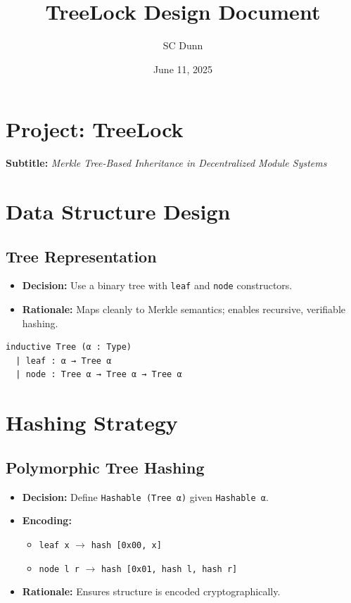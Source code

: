 \documentclass{article}
\title{TreeLock Design Document}
\date{June 11, 2025}
\author{SC Dunn}
\begin{document}
\maketitle

\section*{Project: TreeLock}
\textbf{Subtitle:} \textit{Merkle Tree-Based Inheritance in Decentralized Module Systems}

\section{Data Structure Design}

\subsection*{Tree Representation}
\begin{itemize}[noitemsep]
  \item \textbf{Decision:} Use a binary tree with \texttt{leaf} and \texttt{node} constructors.
  \item \textbf{Rationale:} Maps cleanly to Merkle semantics; enables recursive, verifiable hashing.
\end{itemize}

\begin{lstlisting}[language=lean]
inductive Tree (α : Type)
  | leaf : α → Tree α
  | node : Tree α → Tree α → Tree α
\end{lstlisting}

\section{Hashing Strategy}

\subsection*{Polymorphic Tree Hashing}
\begin{itemize}[noitemsep]
  \item \textbf{Decision:} Define \texttt{Hashable (Tree α)} given \texttt{Hashable α}.
  \item \textbf{Encoding:}
    \begin{itemize}
      \item \texttt{leaf x} $\to$ \texttt{hash [0x00, x]}
      \item \texttt{node l r} $\to$ \texttt{hash [0x01, hash l, hash r]}
    \end{itemize}
  \item \textbf{Rationale:} Ensures structure is encoded cryptographically.
\end{itemize}
\end{document}
